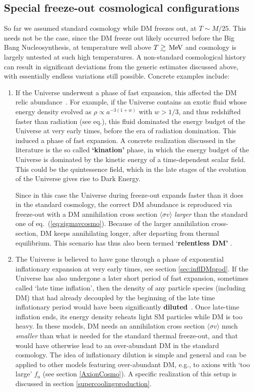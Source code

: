 \subsection{Special freeze-out cosmological configurations}
So far we assumed standard cosmology while DM freezes out, at $T \sim M/25$.
This needs not be the case, since the DM freeze out likely occurred before the Big Bang Nucleosynthesis, at temperature well above $T \gtrsim \,{\rm MeV}$ and cosmology is largely untested at such high temperatures.
A non-standard cosmological history can result in significant deviations from the generic estimates discussed above, with essentially endless variations still possible. 
Concrete examples include:
\begin{enumerate}
\item If the Universe underwent a phase of fast expansion, this affected the DM relic abundance~\cite{relentless}. 
For example, if the Universe contains an exotic fluid whose energy density evolved as 
$\rho \propto a^{-3(1+w)}$ with $w>1/3$, and thus redshifted faster than radiation (see eq.), 
this fluid dominated the energy budget of the Universe at very early times, before the era of radiation domination. 
This induced a phase of fast expansion. 
A concrete realization discussed in the literature is the so called {\bf `kination'} phase, 
in which the energy budget of the Universe is dominated by the kinetic energy of a time-dependent scalar field. 
This could be the quintessence field, which in the late stages of the evolution of the Universe gives rise to Dark Energy.
   
Since in this case the Universe during freeze-out expands faster than it does in the standard cosmology, 
the correct DM abundance is reproduced via freeze-out with a
DM annihilation cross section $\langle \sigma v \rangle$ {\em larger} than the standard one of eq.~(\ref{eq:sigmavcosmo}). 
Because of the larger annihilation cross-section, DM keeps annihilating  longer, after departing from thermal equilibrium. 
This scenario has thus also been termed `{\bf relentless DM'} \cite{relentless}. 


\item The Universe is believed to have gone through a phase of exponential inflationary expansion at very early times, see section \ref{sec:inflDMprod}. If the Universe has also undergone a later short period of fast expansion, sometimes called `late time inflation', then the density of any particle species 
(including DM) that had already decoupled by the beginning of the late time inflationary period would have been significantly {\bf diluted}~\cite{dilutionofDM}.
Once late-time inflation ends, its energy density reheats light SM particles while DM is too heavy.
In these models, DM needs an annihilation cross section $\langle \sigma v \rangle$ much {\em smaller} than what is needed 
for the standard thermal freeze-out, and that would have otherwise lead to an over-abundant DM in the standard cosmology.
The idea of inflationary dilution is simple and general and can be applied to other models featuring over-abundant DM, e.g., to axions with `too large' $f_a$ (see section \ref{AxionCosmo}). A specific realization of this setup is discussed in section \ref{supercoolingproduction}.


\end{enumerate}
